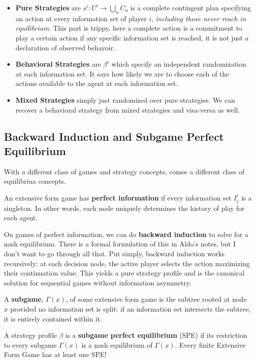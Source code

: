 \documentclass[11pt,english]{article}
\begin{document}
\begin{itemize}
\item \textbf{Pure Strategies} are $s^i:U^i\to \bigcup_u C_u$ is a complete contingent plan specifying an action at every information set of player $i$, \textit{including those never reach in equilibrium}. This part is trippy, here a complete action is a commitment to play a certain action if any specific information set is reached, it is not just a declaration of observed behavoir. 
\item \textbf{Behavioral Strategies} are $\beta^i$ which specify an independent randomization at each information set. It says how likely we are to choose each of the actions available to the agent at each information set.
\item \textbf{Mixed Strategies} simply just randomized over pure strategies. We can recover a behavioral strategy from mixed strategies and visa-versa as well.
\end{itemize}

\subsection{Backward Induction and Subgame Perfect Equilibrium}
With a different class of games and strategy concepts, comes a different class of equilibriua concepts. 
\begin{definition}
An extensive form game has \textbf{perfect information} if every information set $I_j^i$ is a singleton. In other words, each node uniquely determines the history of play for each agent.
\end{definition}
On games of perfect information, we can do \textbf{backward induction} to solve for a nash equilibrium. There is a formal formulation of this in Aldo's notes, but I don't want to go through all that. Put simply, backward induction works recursively: at each decision node, the active player selects the action maximizing their continuation value. This yields a pure strategy profile and is the canonical solution for sequential games without information asymmetry.

\begin{definition}[Subgame]
A \textbf{subgame}, $\Gamma(x)$, of some extensive form game is the subtree rooted at node $x$ provided no information set is split: if an information set intersects the subtree, it is entirely contained within it.
\end{definition}

\begin{definition}
A strategy profile $\beta$ is a \textbf{subgame perfect equilibrium} (SPE) if its restriction to every subgame $\Gamma(x)$ is a nash equilibrium of $\Gamma(x)$. Every finite Extensive Form Game has at least one SPE!
\end{definition}
\end{document}
